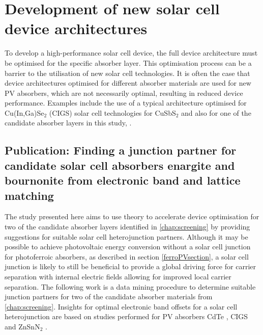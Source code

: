 \documentclass[11pt, twoside]{report}
\begin{document}

\section{Development of new solar cell device architectures}
To develop a high-performance solar cell device, the full device architecture must be optimised for the specific absorber layer. This optimisation process can be a barrier to the utilisation of new solar cell technologies. It is often the case that device architectures optimised for different absorber materials are used for new PV absorbers, which are not necessarily optimal, resulting in reduced device performance. Examples include the use of a typical architecture optimised for Cu(In,Ga)Se$_2$ (CIGS) solar cell technologies for CuSbS$_2$ \cite{CAS_alignment} and also for one of the candidate absorber layers in this study, {\enargite} \cite{enargite_SC}.


\subsection{Publication: Finding a junction partner for candidate solar cell absorbers enargite and bournonite from electronic band and lattice matching}\label{sulfosalt_band_alignment}

 The study presented here aims to use theory to accelerate device optimisation for two of the candidate absorber layers identified in \autoref{chap:screening} by providing suggestions for suitable solar cell heterojunction partners. 
Although it may be possible to achieve photovoltaic energy conversion without a solar cell junction for photoferroic absorbers, as described in section \ref{ferroPVsection}, a solar cell junction is likely to still be beneficial to provide a global driving force for carrier separation with internal electric fields allowing for improved local carrier separation. The following work is a data mining procedure to determine suitable junction partners for two of the candidate absorber materials from \autoref{chap:screening}. Insights for optimal electronic band offsets for a solar cell heterojunction are based on studies performed for PV absorbers CdTe \cite{CdTe_spike}, CIGS \cite{p-type_spike} and ZnSnN$_2$ \cite{Elisabetta}.
\end{document}
